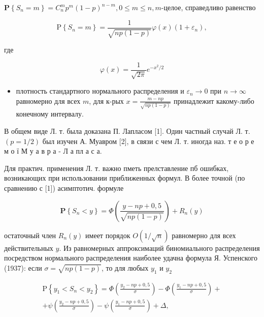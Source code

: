\documentclass[10pt]{article}
\begin{document}
$\mathbf{P}\left\{S_{n}=m\right\}=C_{n}^{m} p^{m}(1-p)^{n-m}, 0 \leqslant m \leqslant n, m$-целое, справедливо равенство



\[

\mathrm{P}\left\{S_{n}=m\right\}=\frac{1}{\sqrt{n p(1-p)}} \varphi(x)\left(1+\varepsilon_{n}\right),

\]



где



\[

\varphi(x)=\frac{1}{\sqrt{2 \pi}} e^{-x^{2} / 2}

\]



\begin{itemize}

  \item плотность стандартного нормального распределения и $\varepsilon_{n} \rightarrow 0$ при $n \rightarrow \infty$ равномерно для всех $m$, для к-рых $x=\frac{m-n p}{\sqrt{n p(1-p)}}$ принадлежит какому-либо конечному интервалу.

\end{itemize}



В общем виде Л. т. была доказана П. Лапласом [1]. Один частный случай Л. т. $(p=1 / 2)$ был изучен А. Муавром [2], в связи с чем Л. т. иногда наз. т е о р е м о ї М у а в р а - Л а пл а с а.



Для практич. применения Л. т. важно пметь прелставление пб ошибках, возникающих при использовании приближенных формул. В более точной (по сравнению с [1]) асимптотич. формуле



\[

\mathbf{P}\left\{S_{n}<y\right\}=\Phi\left(\frac{y-n p+0,5}{\sqrt{n p(1-p)}}\right)+R_{n}(y)

\]



остаточный член $R_{n}(y)$ имеет порядок $O(1 / \sqrt{n})$ равномерно для всех действительных $y$. Из равномерных аппроксимаций биномиального распределения посредством нормального распределения наиболее удачна формула Я. Успенского (1937): если $\sigma=\sqrt{n p(1-p)}$, то для любых $y_{1}$ и $y_{2}$



\[

\begin{gathered}

\mathrm{P}\left\{y_{1}<S_{n}<y_{2}\right\}=\Phi\left(\frac{y_{2}-n p+0,5}{\sigma}\right)-\Phi\left(\frac{y_{1}-n p+0,5}{\sigma}\right)+ \\

+\psi\left(\frac{y_{2}-n p+0,5}{\sigma}\right)-\psi\left(\frac{y_{1}-n p+0,5}{\sigma}\right)+\Delta,

\end{gathered}

\]
\end{document}
